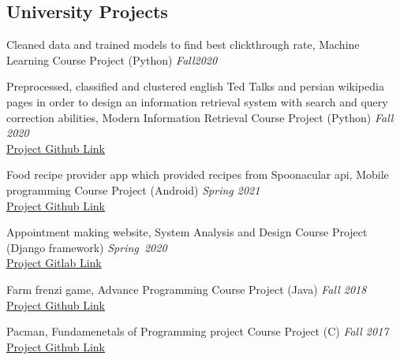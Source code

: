 \documentclass[11pt,line,margin]{resume}
\begin{document}
\begin{resume}
		
\vspace{-0.05in}
\section{\sc University Projects} 
\begin{list2}
\item Cleaned data and trained models to find best clickthrough rate, Machine Learning Course Project (Python)  \hspace*{\fill}\mbox{\textit {Fall2020}}

\item Preprocessed, classified and clustered english Ted Talks and persian wikipedia pages in order to design an information retrieval system with search and query correction abilities, Modern Information Retrieval Course Project (Python) \hfill\textit{Fall 2020}
 \\
\href{https://github.com/mahtabbigverdi/Modern-Information-Retreival}{Project Github Link}
\item Food recipe provider app which provided recipes from Spoonacular api, Mobile programming Course Project (Android) \hfill\textit{Spring 2021} \\
\href{https://github.com/lilygoli/YumYum}{Project Github Link}
\item Appointment making website, System Analysis and Design Course Project (Django framework)  \hspace*{\fill}\mbox{\textit {Spring 2020}}
\\
\href{https://gitlab.com/AradMHM/sad-project}{Project Gitlab Link}
\item Farm frenzi game, Advance Programming Course Project (Java) \hfill\textit{Fall 2018}\\
\href{https://github.com/mdalirrooyfard/AP_7}{Project Github Link}
\item Pacman, Fundamenetals of Programming project Course Project (C) \hfill\textit{Fall 2017} \\
\href{https://github.com/sinaris76/96102104}{Project Github Link}
\end{list2}


\vspace{0.10in}

\end{resume}
\end{document}
